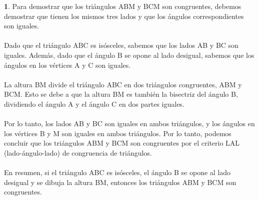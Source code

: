 \documentclass{article}
\begin{document}

{\textbf 1. Para demostrar que los triángulos ABM y BCM son congruentes, debemos demostrar que tienen los mismos tres lados y que los ángulos correspondientes son iguales. }\\
\\
Dado que el triángulo ABC es isósceles, sabemos que los lados AB y BC son iguales. Además, dado que el ángulo B se opone al lado desigual, sabemos que los ángulos en los vértices A y C son iguales.\\
\\
La altura BM divide el triángulo ABC en dos triángulos congruentes, ABM y BCM. Esto se debe a que la altura BM es también la bisectriz del ángulo B, dividiendo el ángulo A y el ángulo C en dos partes iguales.\\
\\
Por lo tanto, los lados AB y BC son iguales en ambos triángulos, y los ángulos en los vértices B y M son iguales en ambos triángulos. Por lo tanto, podemos concluir que los triángulos ABM y BCM son congruentes por el criterio LAL (lado-ángulo-lado) de congruencia de triángulos.\\
\\
En resumen, si el triángulo ABC es isósceles, el ángulo B se opone al lado desigual y se dibuja la altura BM, entonces los triángulos ABM y BCM son congruentes.\\
\end{document}
